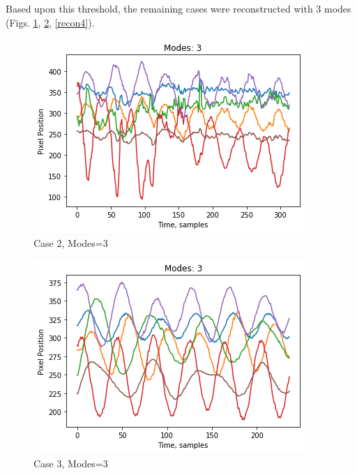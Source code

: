 \documentclass[journal]{IEEEtran}
\begin{document}
Based upon this threshold, the remaining cases were reconstructed with 3 modes (Figs. \ref{recon2}, \ref{recon3}, \ref{recon4}).
\begin{figure}
	\centerline{\includegraphics[width=\columnwidth]{recon2.png}}
	\caption{Case 2, Modes=3}
	\label{recon2}
\end{figure}
\begin{figure}
	\centerline{\includegraphics[width=\columnwidth]{recon3.png}}
	\caption{Case 3, Modes=3}
	\label{recon3}
\end{figure}
\end{document}
